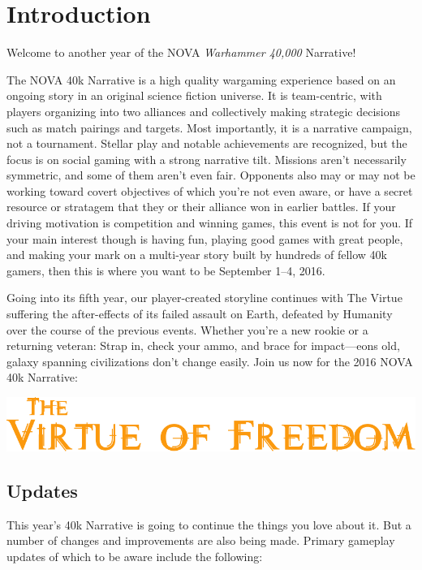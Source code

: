 \chapter{Introduction}

Welcome to another year of the NOVA \textit{Warhammer 40,000}
Narrative!

The NOVA 40k Narrative is a high quality wargaming experience based on
an ongoing story in an original science fiction universe.  It is
team-centric, with players organizing into two alliances and
collectively making strategic decisions such as match pairings and
targets.  Most importantly, it is a narrative campaign, not a
tournament.  Stellar play and notable achievements are recognized, but
the focus is on social gaming with a strong narrative tilt.  Missions
aren't necessarily symmetric, and some of them aren't even fair.
Opponents also may or may not be working toward covert objectives of
which you're not even aware, or have a secret resource or stratagem
that they or their alliance won in earlier battles.  If your driving
motivation is competition and winning games, this event is not for
you.  If your main interest though is having fun, playing good games
with great people, and making your mark on a multi-year story built by
hundreds of fellow 40k gamers, then this is where you want to be
September 1--4, 2016.

Going into its fifth year, our player-created storyline continues with
The Virtue suffering the after-effects of its failed assault on Earth,
defeated by Humanity over the course of the previous events.  Whether
you're a new rookie or a returning veteran: Strap in, check your ammo,
and brace for impact---eons old, galaxy spanning civilizations don't
change easily.  Join us now for the 2016 NOVA 40k Narrative:

\bigskip
\centerline{\includegraphics{art/title/title.pdf}}

\section{Updates}

This year's 40k Narrative is going to continue the things you love
about it.  But a number of changes and improvements are also being
made.  Primary gameplay updates of which to be aware include the
following:

